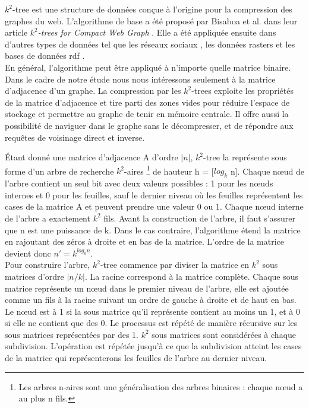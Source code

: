 $k^2$-tree est une structure de données conçue à l'origine pour la compression des graphes du web. L'algorithme de base a été proposé par Bisaboa et al. dans leur article \textit{$k^2$-trees for Compact Web Graph} \citep{brisaboa2009k}. Elle a été appliquée ensuite dans d'autres types de données tel que les réseaux sociaux \citep{shi2012optimizing}, les données rasters \citep{de2013compact} et les bases de données \gls{rdf} \citep{alvarez2017succinct}.\\

En général, l'algorithme peut être appliqué à n'importe quelle matrice binaire. Dans le cadre de notre étude nous nous intéressons seulement à la matrice d'adjacence d'un graphe.
La compression par les $k^2$-trees exploite les propriétés de la matrice d'adjacence et tire parti des zones vides pour réduire l'espace de stockage et permettre au graphe de tenir en mémoire centrale. Il offre aussi la possibilité de naviguer dans le graphe sans le décompresser, et de répondre aux requêtes de voisinage direct et inverse.

Étant donné une matrice d'adjacence A d'ordre $|n|$, $k^2$-tree la représente sous forme d'un arbre de recherche $k^2$-aires \footnote{Les arbres n-aires sont une généralisation des arbres binaires : chaque nœud a au plus n fils.} de hauteur h = [$log_{k}$ n]. Chaque nœud de l'arbre contient un seul bit avec deux valeurs possibles : 1 pour les nœuds internes et 0 pour les feuilles, sauf le dernier niveau où les feuilles représentent les cases de la matrice A et peuvent prendre une valeur 0 ou 1. Chaque nœud interne de l'arbre a exactement $k^2$ fils.  
Avant la construction de l'arbre, il faut s'assurer que n est une puissance de k. Dans le cas contraire, l'algorithme étend la matrice en rajoutant des zéros à droite et en bas de la matrice. L'ordre de la matrice devient donc $n'= k^{log_{k} n}$.\\

Pour construire l'arbre, $k^2$-tree commence par diviser la matrice en $k^{2}$ sous matrices d'ordre $|n/k|$. La racine correspond à la matrice complète. Chaque sous matrice représente un nœud dans le premier niveau de l'arbre, elle est ajoutée comme un fils à la racine suivant un ordre de gauche à droite et de haut en bas. Le nœud est à 1 si la sous matrice qu'il représente contient au moins un 1, et à 0 si elle ne contient que des 0. Le processus est répété de manière récursive sur les sous matrices représentées par des 1. $k^{2}$ sous matrices sont considérées à chaque subdivision. L'opération est répétée jusqu'à ce que la subdivision atteint les cases de la matrice qui représenterons les feuilles de l'arbre au dernier niveau. 

